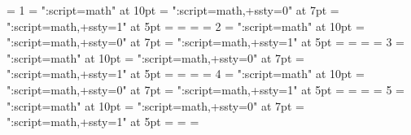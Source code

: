 \ifdefined\mathdelimiterfontname
  \chardef\delimiterfam = 1
  \font   \tendelimiter = "\mathdelimiterfontname:script=math" at 10pt
  \font \sevendelimiter = "\mathdelimiterfontname:script=math,+ssty=0" at 7pt
  \font  \fivedelimiter = "\mathdelimiterfontname:script=math,+ssty=1" at 5pt
  \textfont         \delimiterfam   =   \tendelimiter
  \scriptfont       \delimiterfam   = \sevendelimiter
  \scriptscriptfont \delimiterfam   =  \fivedelimiter
\else \let\delimiterfam=\unimathfam \fi
\ifdefined\mathordfontname
  \chardef\ordfam = 2
  \font   \tenord = "\mathordfontname:script=math" at 10pt
  \font \sevenord = "\mathordfontname:script=math,+ssty=0" at 7pt
  \font  \fiveord = "\mathordfontname:script=math,+ssty=1" at 5pt
  \textfont         \ordfam   =   \tenord
  \scriptfont       \ordfam   = \sevenord
  \scriptscriptfont \ordfam   =  \fiveord
\else \let\ordfam=\unimathfam \fi
\ifdefined\mathopfontname
  \chardef\opfam = 3
  \font   \tenop = "\mathopfontname:script=math" at 10pt
  \font \sevenop = "\mathopfontname:script=math,+ssty=0" at 7pt
  \font  \fiveop = "\mathopfontname:script=math,+ssty=1" at 5pt
  \textfont         \opfam   =   \tenop
  \scriptfont       \opfam   = \sevenop
  \scriptscriptfont \opfam   =  \fiveop
\else \let\opfam=\unimathfam \fi
\ifdefined\mathbinfontname
  \chardef\binfam = 4
  \font   \tenbin = "\mathbinfontname:script=math" at 10pt
  \font \sevenbin = "\mathbinfontname:script=math,+ssty=0" at 7pt
  \font  \fivebin = "\mathbinfontname:script=math,+ssty=1" at 5pt
  \textfont         \binfam   =   \tenbin
  \scriptfont       \binfam   = \sevenbin
  \scriptscriptfont \binfam   =  \fivebin
\else \let\binfam=\unimathfam \fi
\ifdefined\mathaccentfontname
  \chardef\accentfam = 5
  \font   \tenaccent = "\mathaccentfontname:script=math" at 10pt
  \font \sevenaccent = "\mathaccentfontname:script=math,+ssty=0" at 7pt
  \font  \fiveaccent = "\mathaccentfontname:script=math,+ssty=1" at 5pt
  \textfont         \accentfam   =   \tenaccent
  \scriptfont       \accentfam   = \sevenaccent
  \scriptscriptfont \accentfam   =  \fiveaccent
\else \let\accentfam=\unimathfam \fi
%
%
\ifdefined\mathalphafontname\else\let\mathalphafontname\mathfontname\fi
